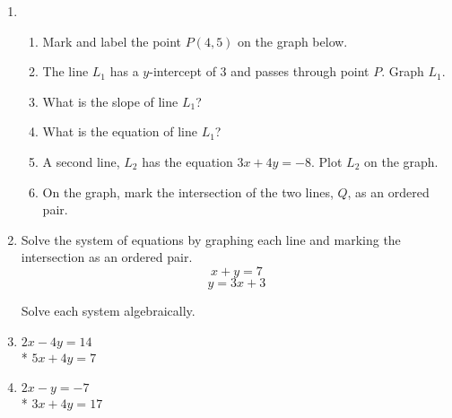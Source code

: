 \documentclass[12pt, oneside]{article}
\begin{document}
\begin{enumerate}
\newpage
\item
  \begin{enumerate}
    \item Mark and label the point $P(4, 5)$ on the graph below.
    \item The line $L_1$ has a $y$-intercept of 3 and passes through point $P$. Graph $L_1$.
    \item What is the slope of line $L_1$? \vspace{2cm}
    \item What is the equation of line $L_1$? \vspace{2cm}
    \item A second line, $L_2$ has the equation $3x+4y=-8$. Plot $L_2$ on the graph.
    \item On the graph, mark the intersection of the two lines, $Q$, as an ordered pair.
  \end{enumerate}

  \begin{center} %
  \end{center}

\newpage
  \item Solve the system of equations by graphing each line and marking the intersection as an ordered pair.
    \[x+y=7\]
    \[y=3x+3\]

\begin{center} %
\end{center}

\newpage
  Solve each system algebraically.
  \item
  $2x-4y=14$\\*
  $5x+4y=7$ \vspace{6cm}

  \item
  $2x-y=-7$\\*
  $3x+4y=17$  \vspace{6cm}



\end{enumerate}
\end{document}
